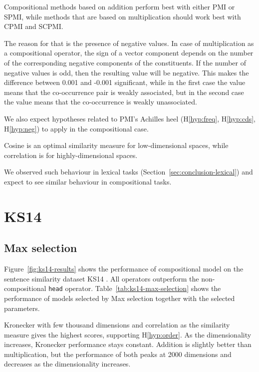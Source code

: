 \begin{hyp}
  \label{hyp:comp-pmi-cpmi}
  Compositional methods based on addition perform best with either PMI or SPMI, while methods that are based on multiplication should work best with CPMI and SCPMI.
\end{hyp}

The reason for that is the presence of negative values. In case of multiplication as a compositional operator, the sign of a vector component depends on the number of the corresponding negative components of the constituents. If the number of negative values is odd, then the resulting value will be negative. This makes the difference between 0.001 and -0.001 significant, while in the first case the value means that the co-occurrence pair is weakly associated, but in the second case the value means that the co-occurrence is weakly unassociated.

We also expect hypotheses related to PMI's Achilles heel (H\ref{hyp:freq}, H\ref{hyp:cds}, H\ref{hyp:neg}) to apply in the compositional case.

\begin{hyp}
  \label{hyp:similarity}
  Cosine is an optimal similarity measure for low-dimensional spaces, while correlation is for highly-dimensional spaces.
\end{hyp}

We observed such behaviour in lexical tasks (Section~\ref{sec:conclusion-lexical}) and expect to see similar behaviour in compositional tasks.

\section{KS14}
\label{sec:ks14}

\subsection{Max selection}
\label{sec:max-selection-ks14}



Figure~\ref{fig:ks14-results} shows the performance of compositional model on the sentence similarity dataset KS14 \cite{kartsadrqpl2014}. All operators outperform the non-compositional \texttt{head} operator. Table~\ref{tab:ks14-max-selection} shows the performance of models selected by Max selection together with the selected parameters.

Kronecker with few thousand dimensions and correlation as the similarity measure gives the highest scores, supporting H\ref{hyp:order}. As the dimensionality increases, Kronecker performance stays constant. Addition is slightly better than multiplication, but the performance of both peaks at 2000 dimensions and decreases as the dimensionality increases.

